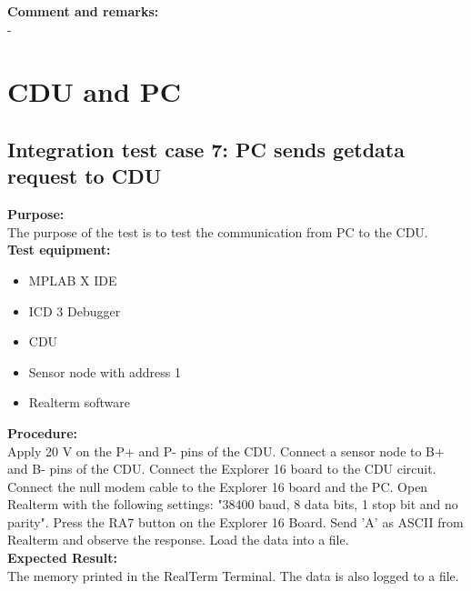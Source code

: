 \textbf{Comment and remarks:}\\
-\\


\section{CDU and PC}
\subsection{Integration test case 7: PC sends getdata request to CDU}
\textbf{Purpose:}\\
The purpose of the test is to test the communication from PC to the CDU.\\

\textbf{Test equipment:}
\begin{itemize}
\item MPLAB X IDE
\item ICD 3 Debugger
\item CDU
\item Sensor node with address 1
\item Realterm software
\end{itemize}

\textbf{Procedure:}\\
Apply 20 V on the P+ and P- pins of the CDU. Connect a sensor node to B+ and B- pins of the CDU. Connect the Explorer 16 board to the CDU circuit. Connect the null modem cable to the Explorer 16 board and the PC. Open Realterm with the following settings: "38400 baud, 8 data bits, 1 stop bit and no parity". Press the RA7 button on the Explorer 16 Board. Send 'A' as ASCII from Realterm and observe the response. Load the data into a file.\\

\textbf{Expected Result:}\\
The memory printed in the RealTerm Terminal. The data is also logged to a file.\\

